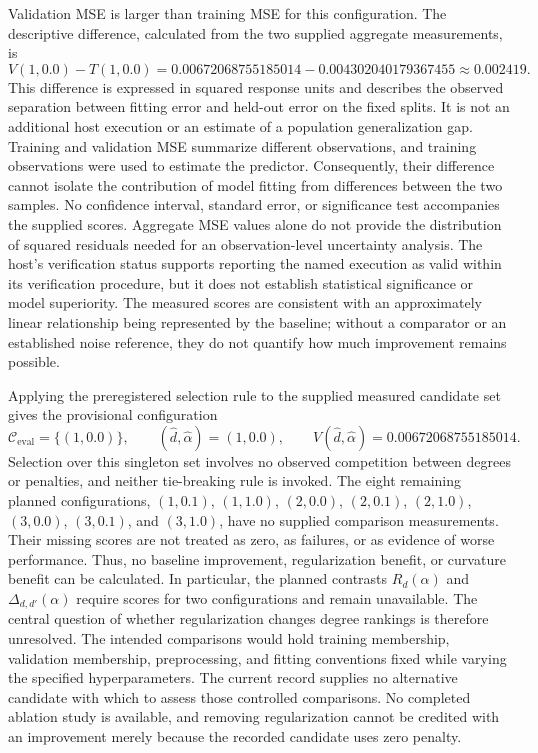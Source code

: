 \documentclass[11pt]{article}
\begin{document}
Validation MSE is larger than training MSE for this configuration. The descriptive difference, calculated from the two supplied aggregate measurements, is
\[
V(1,0.0)-T(1,0.0)
=
0.00672068755185014-0.004302040179367455
\approx 0.002419.
\]
This difference is expressed in squared response units and describes the observed separation between fitting error and held-out error on the fixed splits. It is not an additional host execution or an estimate of a population generalization gap. Training and validation MSE summarize different observations, and training observations were used to estimate the predictor. Consequently, their difference cannot isolate the contribution of model fitting from differences between the two samples. No confidence interval, standard error, or significance test accompanies the supplied scores. Aggregate MSE values alone do not provide the distribution of squared residuals needed for an observation-level uncertainty analysis. The host's verification status supports reporting the named execution as valid within its verification procedure, but it does not establish statistical significance or model superiority. The measured scores are consistent with an approximately linear relationship being represented by the baseline; without a comparator or an established noise reference, they do not quantify how much improvement remains possible.

Applying the preregistered selection rule to the supplied measured candidate set gives the provisional configuration
\[
\mathcal{C}_{\mathrm{eval}}=\{(1,0.0)\},
\qquad
(\widehat d,\widehat\alpha)=(1,0.0),
\qquad
V(\widehat d,\widehat\alpha)=0.00672068755185014.
\]
Selection over this singleton set involves no observed competition between degrees or penalties, and neither tie-breaking rule is invoked. The eight remaining planned configurations, \((1,0.1)\), \((1,1.0)\), \((2,0.0)\), \((2,0.1)\), \((2,1.0)\), \((3,0.0)\), \((3,0.1)\), and \((3,1.0)\), have no supplied comparison measurements. Their missing scores are not treated as zero, as failures, or as evidence of worse performance. Thus, no baseline improvement, regularization benefit, or curvature benefit can be calculated. In particular, the planned contrasts \(R_d(\alpha)\) and \(\Delta_{d,d'}(\alpha)\) require scores for two configurations and remain unavailable. The central question of whether regularization changes degree rankings is therefore unresolved. The intended comparisons would hold training membership, validation membership, preprocessing, and fitting conventions fixed while varying the specified hyperparameters. The current record supplies no alternative candidate with which to assess those controlled comparisons. No completed ablation study is available, and removing regularization cannot be credited with an improvement merely because the recorded candidate uses zero penalty.
\end{document}
